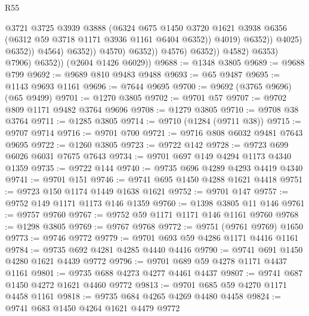 \begin{lexlean}{R55}
\begin{coremodule}
                                              @3721
                                              @3725
                                              @3939
                                              @3888
                                              (@6324
                                                @675
                                                @1450
                                                @3720
                                                @1621
                                                @3938
                                                @6356
                                                (@6312 @59 @3718 @1171 @3936 @1161 @6404 @6352))
                                              @4019)
                                            @6352))
                                        @4025)
                                      @6352))
                                  @4564)
                                @6352))
                            @4570)
                          @6352))
                      @4576)
                    @6352))
                @4582)
              @6353)
            @7906)
          @6352))
      (@2604 @1426 @6029))
@9688 := @1348 @3805
@9689 := @9688 @799
@9692 := @9689 @810 @9483 @9488
@9693 := @65 @9487
@9695 := @1143 @9693 @1161
@9696 := @7644 @9695
@9700 := @9692 (@3765 @9696) (@65 @9499)
@9701 := @1270 @3805
@9702 := @9701 @57
@9707 := @9702 @809 @1171 @9482 @3764 @9696
@9708 := @1279 @3805
@9710 := @9708 @38 @3764
@9711 := @1285 @3805
@9714 := @9710 (@1284 (@9711 @38))
@9715 := @9707 @9714
@9716 := @9701 @700
@9721 := @9716 @808 @6032 @9481 @7643 @9695
@9722 := @1260 @3805
@9723 := @9722 @142
@9728 := @9723 @699 @6026 @6031 @7675 @7643
@9734 := @9701 @697 @149 @4294 @1173 @4340 @1359
@9735 := @9722 @144
@9740 := @9735 @696 @4289 @4293 @4419 @4340
@9741 := @9701 @151
@9746 := @9741 @695 @1450 @4288 @1621 @4418
@9751 := @9723 @150 @1174 @1449 @1638 @1621
@9752 := @9701 @147
@9757 := @9752 @149 @1171 @1173 @146 @1359
@9760 := @1398 @3805 @11 @146
@9761 := @9757 @9760
@9767 := @9752 @59 @1171 @1171 @146 @1161 @9760
@9768 := @1298 @3805
@9769 := @9767 @9768
@9772 := @9751 (@9761 @9769) @1650
@9773 := @9746 @9772
@9779 := @9701 @693 @59 @4286 @1171 @4416 @1161
@9784 := @9735 @692 @4281 @4285 @4440 @4416
@9790 := @9741 @691 @1450 @4280 @1621 @4439 @9772
@9796 := @9701 @689 @59 @4278 @1171 @4437 @1161
@9801 := @9735 @688 @4273 @4277 @4461 @4437
@9807 := @9741 @687 @1450 @4272 @1621 @4460 @9772
@9813 := @9701 @685 @59 @4270 @1171 @4458 @1161
@9818 := @9735 @684 @4265 @4269 @4480 @4458
@9824 := @9741 @683 @1450 @4264 @1621 @4479 @9772

\end{coremodule}
\end{lexlean}
